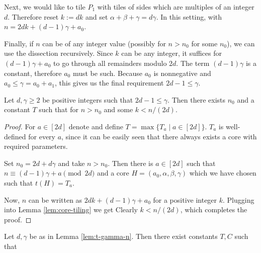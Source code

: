 Next, we would like to tile $P_1$ with tiles of sides which are multiples of an integer $d$. Therefore reset $k := dk$ and set $\alpha+\beta+\gamma = d\gamma$. In this setting,
with $n = 2dk + (d-1)\gamma + a_0$.

Finally, if $n$ can be of any integer value (possibly for $n > n_0$ for some $n_0$), we can use the dissection recursively. Since $k$ can be any integer, it suffices for $(d-1)\gamma + a_0$ to go through all remainders modulo $2d$. The term $(d-1)\gamma$ is a constant, therefore $a_0$ must be such. Because $a_0$ is nonnegative and $a_0 \leq \gamma = a_0 + a_1$, this gives us the final requirement $2d-1 \leq \gamma$.

\begin{lem}
\label{lem:t-gamma-n}

Let $d,\gamma \geq 2$ be positive integers such that $2d-1 \leq \gamma$. Then there exists $n_0$ and a constant $T$ such that
%
for $n > n_0$ and some $k < n/(2d)$.
\end{lem}
\begin{proof}
For $a \in [2d]$ denote
%
and define $T = \max \{T_a \mid a \in [2d]\}$. $T_a$ is well-defined for every $a$, since it can be easily seen that there always exists a core with required parameters.

Set $n_0 = 2d+d\gamma$ and take $n > n_0$. Then there is $a \in [2d]$ such that $n \equiv (d-1)\gamma + a \pmod{2d}$ and a core $H=(a_0,\alpha,\beta,\gamma)$ which we have chosen such that $t(H) = T_a$.

Now, $n$ can be written as $2dk + (d-1)\gamma + a_0$ for a positive integer $k$. Plugging into Lemma \ref{lem:core-tiling} we get
%
Clearly $k < n/(2d)$, which completes the proof.
\end{proof}

\begin{cor}
\label{cor:log-t-gamma-n}
Let $d,\gamma$ be as in Lemma \ref{lem:t-gamma-n}. Then there exist constants $T,C$ such that
%
\end{cor}%

